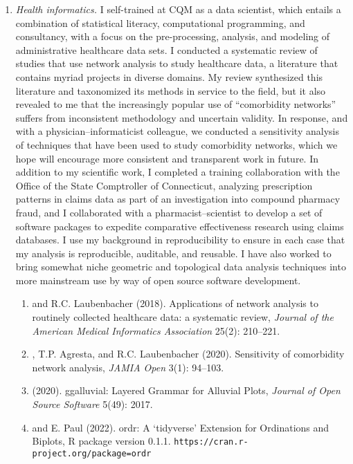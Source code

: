\documentclass{nihbiosketch}
\begin{document}
\begin{enumerate}
\item \emph{Health informatics.}
I self-trained at CQM as a data scientist, which entails a combination of statistical literacy, computational programming, and consultancy, with a focus on the pre-processing, analysis, and modeling of administrative healthcare data sets.
I conducted a systematic review of studies that use network analysis to study healthcare data, a literature that contains myriad projects in diverse domains. My review synthesized this literature and taxonomized its methods in service to the field, but it also revealed to me that the increasingly popular use of ``comorbidity networks'' suffers from inconsistent methodology and uncertain validity. In response, and with a physician--informaticist colleague, we conducted a sensitivity analysis of techniques that have been used to study comorbidity networks, which we hope will encourage more consistent and transparent work in future.
In addition to my scientific work, I completed a training collaboration with the Office of the State Comptroller of Connecticut, analyzing prescription patterns in claims data as part of an investigation into compound pharmacy fraud, and I collaborated with a pharmacist--scientist to develop a set of software packages to expedite comparative effectiveness research using claims databases.
I use my background in reproducibility to ensure in each case that my analysis is reproducible, auditable, and reusable. I have also worked to bring somewhat niche geometric and topological data analysis techniques into more mainstream use by way of open source software development.

\begin{enumerate}
\item {} and R.C. Laubenbacher (2018). Applications of network analysis to routinely collected healthcare data: a systematic review, \emph{Journal of the American Medical Informatics Association} 25(2): 210--221.
\item {}, T.P. Agresta, and R.C. Laubenbacher (2020). Sensitivity of comorbidity network analysis, \emph{JAMIA Open} 3(1): 94--103.
\item {} (2020). ggalluvial: Layered Grammar for Alluvial Plots, \emph{Journal of Open Source Software} 5(49): 2017.
\item {} and E. Paul (2022). ordr: A `tidyverse' Extension for Ordinations and Biplots, R package version 0.1.1. \nolinkurl{https://cran.r-project.org/package=ordr}
\end{enumerate}


\end{enumerate}
\end{document}
